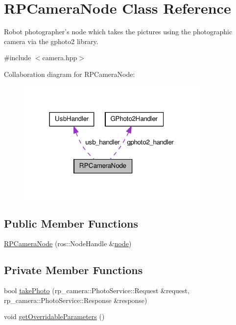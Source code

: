 \hypertarget{class_r_p_camera_node}{\section{\-R\-P\-Camera\-Node \-Class \-Reference}
\label{class_r_p_camera_node}
}


\-Robot photographer's node which takes the pictures using the photographic camera via the gphoto2 library.  




{\ttfamily \#include $<$camera.\-hpp$>$}



\-Collaboration diagram for \-R\-P\-Camera\-Node\-:\nopagebreak
\begin{figure}[H]
\begin{center}
\leavevmode
\includegraphics[width=271pt]{class_r_p_camera_node__coll__graph}
\end{center}
\end{figure}
\subsection*{\-Public \-Member \-Functions}
\begin{DoxyCompactItemize}
\item 
\hyperlink{class_r_p_camera_node_a760e6e4ca3230f8c1e74a326a1f3b790}{\-R\-P\-Camera\-Node} (ros\-::\-Node\-Handle \&\hyperlink{class_r_p_camera_node_a258bd2f067f146b88e9f7463f3ef9f3d}{node})
\end{DoxyCompactItemize}
\subsection*{\-Private \-Member \-Functions}
\begin{DoxyCompactItemize}
\item 
bool \hyperlink{class_r_p_camera_node_af1cef4948433c283d26e0aaaf33523bd}{take\-Photo} (rp\-\_\-camera\-::\-Photo\-Service\-::\-Request \&request, rp\-\_\-camera\-::\-Photo\-Service\-::\-Response \&response)
\item 
void \hyperlink{class_r_p_camera_node_a20039ac6f9da622c04ca54bb68fd99f3}{get\-Overridable\-Parameters} ()
\end{DoxyCompactItemize}
